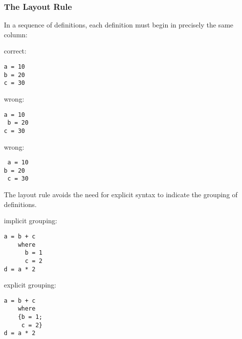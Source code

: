 \begin{multicols}{2}
\subsubsection{The Layout Rule}
In a sequence of definitions, each definition must begin in precisely the same column:
\begin{multicols}{3}
correct:
\begin{lstlisting}
a = 10
b = 20
c = 30
\end{lstlisting}
\vfill\null
\columnbreak
wrong:
\begin{lstlisting}
a = 10
 b = 20
c = 30
\end{lstlisting}
\vfill\null
\columnbreak
wrong:
\begin{lstlisting}
 a = 10
b = 20
 c = 30
\end{lstlisting}
\vfill\null
\end{multicols}
The layout rule avoids the need for explicit syntax to indicate the grouping of definitions.
\begin{multicols}{2}
implicit grouping:
\begin{lstlisting}
a = b + c
    where
      b = 1
      c = 2
d = a * 2
\end{lstlisting}
\vfill\null
\columnbreak
explicit grouping:
\begin{lstlisting}
a = b + c
    where
    {b = 1;
     c = 2}
d = a * 2
\end{lstlisting}
\vfill\null
\end{multicols}



\end{multicols}
